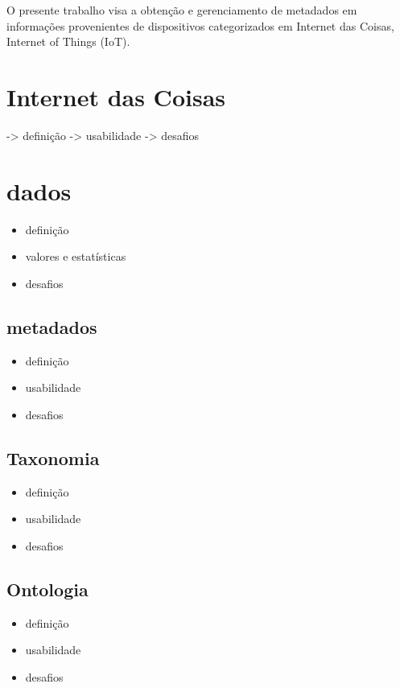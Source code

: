 O presente trabalho visa a obtenção e gerenciamento de metadados em informações provenientes de
dispositivos categorizados em Internet das Coisas, Internet of Things (IoT). %


\section{Internet das Coisas}%

	-> definição
	-> usabilidade
	-> desafios
\section{dados}%
	\begin{itemize}
		\item definição
		\item valores e estatísticas
		\item desafios
	\end{itemize}
	\subsection{metadados}
		\begin{itemize}
			\item definição
			\item usabilidade
			\item desafios
		\end{itemize}
	\subsection{Taxonomia}
		\begin{itemize}
			\item definição
			\item usabilidade
			\item desafios
		\end{itemize}
	\subsection{Ontologia}
		\begin{itemize}
			\item definição
		 	\item usabilidade
			\item desafios
		\end{itemize}
